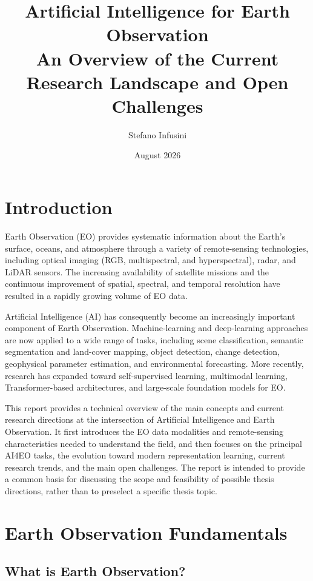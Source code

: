 \documentclass[11pt,a4paper]{article}
\title{
    \textbf{Artificial Intelligence for Earth Observation}\\
    \vspace{0.3cm}
    \large An Overview of the Current Research Landscape and Open Challenges
}
\author{Stefano Infusini}
\date{August 2026}
\begin{document}
\maketitle

\tableofcontents

\newpage

\section{Introduction}

Earth Observation (EO) provides systematic information about the Earth's surface, oceans, and atmosphere through a variety of remote-sensing technologies, including optical imaging (RGB, multispectral, and hyperspectral), radar, and LiDAR sensors. The increasing availability of satellite missions and the continuous improvement of spatial, spectral, and temporal resolution have resulted in a rapidly growing volume of EO data.

Artificial Intelligence (AI) has consequently become an increasingly important component of Earth Observation. Machine-learning and deep-learning approaches are now applied to a wide range of tasks, including scene classification, semantic segmentation and land-cover mapping, object detection, change detection, geophysical parameter estimation, and environmental forecasting. More recently, research has expanded toward self-supervised learning, multimodal learning, Transformer-based architectures, and large-scale foundation models for EO.

This report provides a technical overview of the main concepts and current research directions at the intersection of Artificial Intelligence and Earth Observation. It first introduces the EO data modalities and remote-sensing characteristics needed to understand the field, and then focuses on the principal AI4EO tasks, the evolution toward modern representation learning, current research trends, and the main open challenges. The report is intended to provide a common basis for discussing the scope and feasibility of possible thesis directions, rather than to preselect a specific thesis topic.


\section{Earth Observation Fundamentals}

\subsection{What is Earth Observation?}
\end{document}
